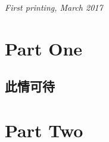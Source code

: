 \documentclass[11pt,fleqn]{book} %
\begin{document}
\noindent \textit{First printing, March 2017} %




\pagestyle{empty} %

\tableofcontents %




\part{Part One}



\chapter{此情可待}














\part{Part Two}
\end{document}
